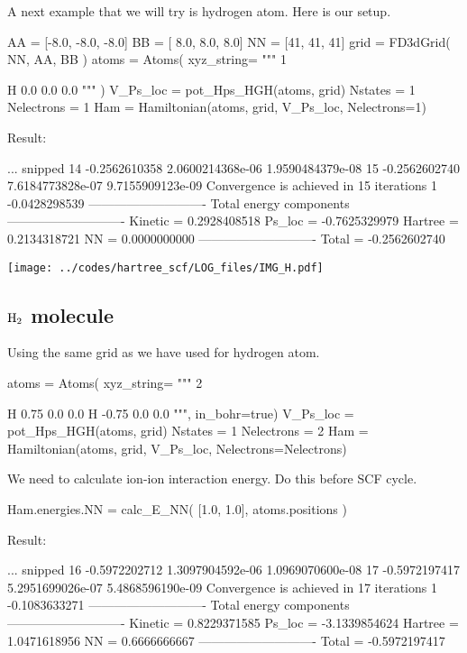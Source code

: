 A next example that we will try is hydrogen atom. Here is our setup.
\begin{juliacode}
AA = [-8.0, -8.0, -8.0]
BB = [ 8.0,  8.0,  8.0]
NN = [41, 41, 41]
grid = FD3dGrid( NN, AA, BB )
atoms = Atoms( xyz_string=
  """
  1

  H  0.0  0.0  0.0
  """ )
V_Ps_loc = pot_Hps_HGH(atoms, grid)
Nstates = 1
Nelectrons = 1
Ham = Hamiltonian(atoms, grid, V_Ps_loc, Nelectrons=1)
\end{juliacode}

Result:
\begin{textcode}
... snipped
14      -0.2562610358   2.0600214368e-06   1.9590484379e-08
15      -0.2562602740   7.6184773828e-07   9.7155909123e-09
Convergence is achieved in 15 iterations
1      -0.0428298539
----------------------------
Total energy components
----------------------------
Kinetic =       0.2928408518
Ps_loc  =      -0.7625329979
Hartree =       0.2134318721
NN      =       0.0000000000
----------------------------
Total   =      -0.2562602740
\end{textcode}


{\center
\texttt{[image: ../codes/hartree\_scf/LOG\_files/IMG\_H.pdf]}
\par}




\subsection{$\ce{H2}$ molecule}


Using the same grid as we have used for hydrogen atom.

\begin{juliacode}
atoms = Atoms( xyz_string=
  """
  2
  
  H   0.75  0.0  0.0
  H  -0.75  0.0  0.0
  """, in_bohr=true)
V_Ps_loc = pot_Hps_HGH(atoms, grid)
Nstates = 1
Nelectrons = 2
Ham = Hamiltonian(atoms, grid, V_Ps_loc, Nelectrons=Nelectrons)
\end{juliacode}

We need to calculate ion-ion interaction energy. Do this before SCF cycle.

\begin{juliacode}
Ham.energies.NN = calc_E_NN( [1.0, 1.0], atoms.positions )
\end{juliacode}

Result:
\begin{textcode}
... snipped
16      -0.5972202712   1.3097904592e-06   1.0969070600e-08
17      -0.5972197417   5.2951699026e-07   5.4868596190e-09
Convergence is achieved in 17 iterations
1      -0.1083633271
----------------------------
Total energy components
----------------------------
Kinetic =       0.8229371585
Ps_loc  =      -3.1339854624
Hartree =       1.0471618956
NN      =       0.6666666667
----------------------------
Total   =      -0.5972197417
\end{textcode}

